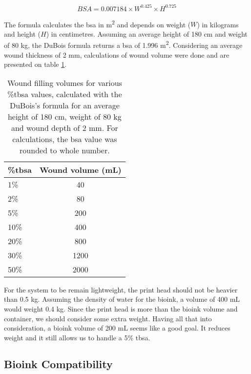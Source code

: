 \begin{equation}
\label{eq:dubois_formula}
    BSA = 0.007184 \times W^{0.425} \times H^{0.725}
\end{equation}

The formula calculates the \gls{bsa} in \si{\meter\squared} and depends on weight ($W$) in kilograms and height ($H$) in centimetres. Assuming an average height of 180 cm and weight of 80 kg, the DuBois formula returns a \gls{bsa} of 1.996 \si{\meter\squared}. Considering an average wound thickness of 2 \si{\milli\meter}, calculations of wound volume were done and are presented on table \ref{tab:system_architecture_requirements_wound_volumes}.

\begin{table}[ht]
	\caption[Wound filling volumes.]{Wound filling volumes for various \%\gls{tbsa} values, calculated with the DuBois's formula for an average height of 180 cm, weight of 80 kg and wound depth of 2 \si{\milli\meter}. For calculations, the \gls{bsa} value was rounded to whole number.}
	\label{tab:system_architecture_requirements_wound_volumes}
\centering
\begin{tabular}{lc}
	\toprule
	\textbf{\%\gls{tbsa}} & \textbf{Wound volume (\si{\milli\liter})}\\
	\midrule

    1\% & 40 \\
    2\% & 80 \\
    5\% & 200 \\
    10\% & 400 \\
    20\% & 800 \\
    30\% & 1200 \\
    50\% & 2000 \\
    \bottomrule
\end{tabular}
\end{table}

For the system to be remain lightweight, the print head should not be heavier than 0.5 \si{\kilo\gram}. Assuming the density of water for the bioink, a volume of 400 \si{\milli\liter} would weight 0.4 \si{\kilo\gram}. Since the print head is more than the bioink volume and container, we should consider some extra weight. Having all that into consideration, a bioink volume of 200 \si{\milli\liter} seems like a good goal. It reduces weight and it still allows us to handle a 5\% \gls{tbsa}.


\subsection{Bioink Compatibility}
\label{subsec:system_architecture_requirements_bioprinting_bioink_compatibility}

